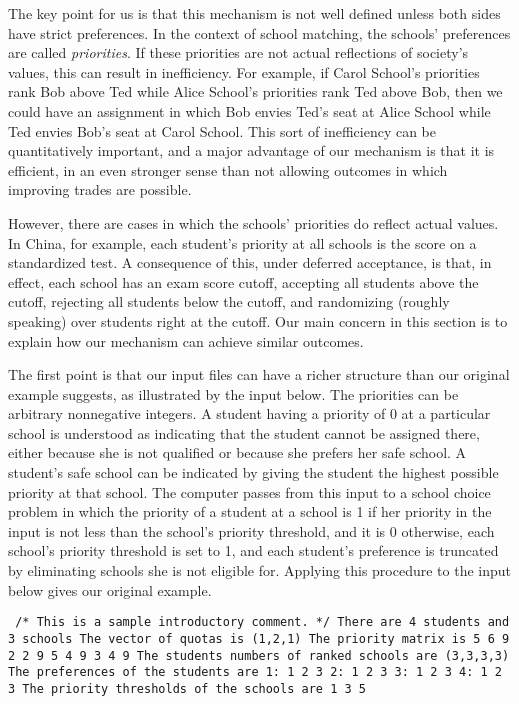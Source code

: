 \documentclass[12pt]{article}
\theoremstyle{definition}
\begin{document}
The key point for us is that this mechanism is not well defined unless
both sides have strict preferences.  In the context of school
matching, the schools' preferences are called \emph{priorities}.  If
these priorities are not actual reflections of society's values, this
can result in inefficiency.  For example, if Carol School's priorities
rank Bob above Ted while Alice School's priorities rank Ted above Bob,
then we could have an assignment in which Bob envies Ted's seat at
Alice School while Ted envies Bob's seat at Carol School.  This sort
of inefficiency can be quantitatively important, and a major advantage
of our mechanism is that it is efficient, in an even stronger sense
than not allowing outcomes in which improving trades are possible.

However, there are cases in which the schools' priorities do reflect
actual values.  In China, for example, each student's priority at all
schools is the score on a standardized test.  A consequence of this,
under deferred acceptance, is that, in effect, each school has an exam
score cutoff, accepting all students above the cutoff, rejecting all
students below the cutoff, and randomizing (roughly speaking) over
students right at the cutoff.  Our main concern in this section is to
explain how our mechanism can achieve similar outcomes.

The first point is that our input files can have a richer structure
than our original example suggests, as illustrated by the input below.
The priorities can be arbitrary nonnegative integers.  A student
having a priority of 0 at a particular school is understood as
indicating that the student cannot be assigned there, either because
she is not qualified or because she prefers her safe school.  A
student's safe school can be indicated by giving the student the
highest possible priority at that school.  The computer passes from
this input to a school choice problem in which the priority of a
student at a school is 1 if her priority in the input is not less than
the school's priority threshold, and it is 0 otherwise, each school's
priority threshold is set to 1, and each student's preference is
truncated by eliminating schools she is not eligible for.  Applying
this procedure to the input below gives our original example.

\begin{obeylines}\texttt{
/* This is a sample introductory comment. */
There are 4 students and 3 schools
The vector of quotas is (1,2,1)
The priority matrix is
     5     6     9
     2     2     9
     5     4     9
     3     4     9
The students numbers of ranked schools are (3,3,3,3)
The preferences of the students are
1:  1  2  3  
2:  1  2  3  
3:  1  2  3  
4:  1  2  3  
The priority thresholds of the schools are
1   3   5   
  }
\end{obeylines}
\end{document}
